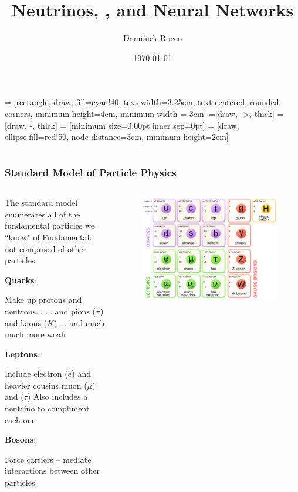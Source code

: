 \documentclass[10pt,professionalfonts,xcolor=table]{beamer}
\title{Neutrinos, \nova, and Neural Networks}
\author[D. Rocco]{Dominick Rocco}
\date{\today}
\institute{University of Minnesota}
\begin{document}
 = [rectangle, draw, fill=cyan!40,
   text width=3.25cm, text centered, rounded corners, minimum height=4em, minimum width = 3cm]
=[draw, ->, thick]
=[draw, -, thick]
 = [minimum size=0.00pt,inner sep=0pt]
 = [draw, ellipse,fill=red!50, node distance=3cm,
   minimum height=2em]

\frame{\titlepage}

\section[Outline]{}

\frame
{
  \frametitle{Standard Model of Particle Physics}

\begin{columns}[c]
  \begin{itemize}
  \bang The standard model enumerates all of the fundamental particles we ``know" of
  \bang Fundamental: not comprised of other particles

  \bang \textbf{Quarks}:
    \begin{itemize}
    \bing Make up protons and neutrons...
    \bong ... and pions ($\pi$) and kaons ($K$)
    \bong ... and much much more woah

    \end{itemize}
  \bang \textbf{Leptons}:
    \begin{itemize}
    \bing Include electron ($e$) and heavier cousins muon ($\mu$) and ($\tau$)
    \bing Also includes a neutrino to compliment each one
    \end{itemize}
  \bang \textbf{Bosons}:
    \begin{itemize}
    \bing Force carriers -- mediate interactions between other particles
    \end{itemize}

  \end{itemize}
    \begin{figure}
  \includegraphics[width=\textwidth]{figures/figures/sm.png}
  \end{figure}
\end{columns}

}
\end{document}
